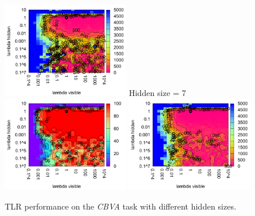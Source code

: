 \begin{figure}[H]
  \includegraphics[width=0.49\textwidth]{img/k3/tlr-5-epoch.pdf}  
  Hidden size = 7 \\
  \includegraphics[width=0.49\textwidth]{img/k3/tlr-7-success.pdf} 
  \includegraphics[width=0.49\textwidth]{img/k3/tlr-7-epoch.pdf}    
  \caption{TLR performance on the \emph{CBVA} task with different hidden sizes.}
  \label{fig:results-tlr-k3-success}
\end{figure}

